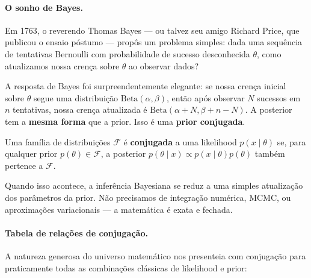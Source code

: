 \documentclass{tufte-handout}
\begin{document}
\paragraph{O sonho de Bayes.}

Em 1763, o reverendo Thomas Bayes --- ou talvez seu amigo Richard Price, que publicou o ensaio póstumo --- propôs um problema simples: dada uma sequência de tentativas Bernoulli com probabilidade de sucesso desconhecida $\theta$, como atualizamos nossa crença sobre $\theta$ ao observar dados?

A resposta de Bayes foi surpreendentemente elegante: se nossa crença inicial sobre $\theta$ segue uma distribuição $\text{Beta}(\alpha, \beta)$, então após observar $N$ sucessos em $n$ tentativas, nossa crença atualizada é $\text{Beta}(\alpha + N, \beta + n - N)$. A posterior tem a \textbf{mesma forma} que a prior. Isso é uma \textbf{prior conjugada}.

\begin{defn}
    Uma família de distribuições $\mathcal{F}$ é \textbf{conjugada} a uma likelihood $p(x \mid \theta)$ se, para qualquer prior $p(\theta) \in \mathcal{F}$, a posterior $p(\theta \mid x) \propto p(x \mid \theta) p(\theta)$ também pertence a $\mathcal{F}$.
\end{defn}

Quando isso acontece, a inferência Bayesiana se reduz a uma simples atualização dos parâmetros da prior. Não precisamos de integração numérica, MCMC, ou aproximações variacionais --- a matemática é exata e fechada.

\paragraph{Tabela de relações de conjugação.}

A natureza generosa do universo matemático nos presenteia com conjugação para praticamente todas as combinações clássicas de likelihood e prior:
\end{document}
